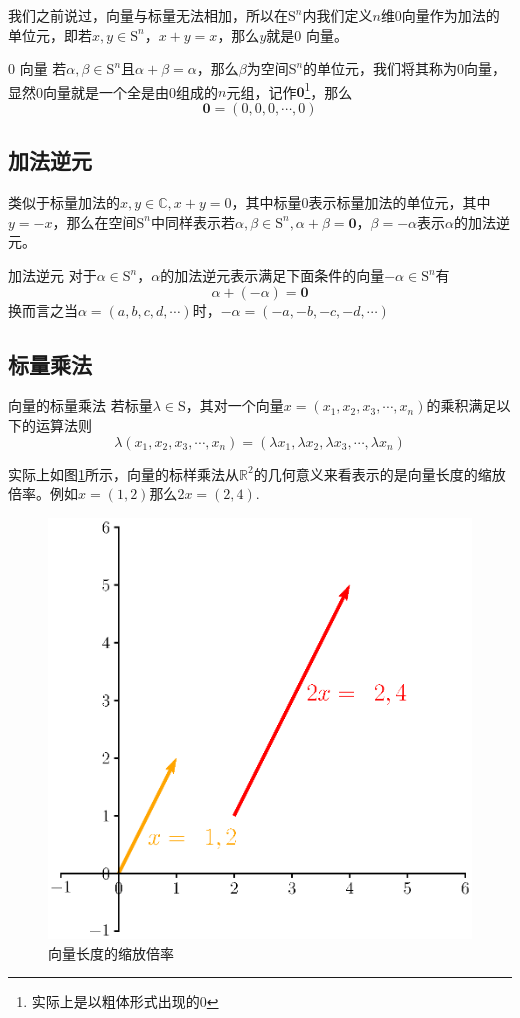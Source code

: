 我们之前说过，向量与标量无法相加，所以在$\mathrm{S}^n$内我们定义$n$维0向量作为加法的单位元，即若$x,y\in \mathrm{S}^n$，$x+y=x$，那么$y$就是0 向量。

\begin{definition}{0 向量}
	若$\alpha,\beta \in \mathrm{S}^n$且$\alpha+\beta = \alpha$，那么$\beta$为空间$\mathrm{S}^n$的单位元，我们将其称为0向量，显然0向量就是一个全是由0组成的$n$元组，记作$\boldsymbol{0}$\footnote{实际上是以粗体形式出现的0}，那么$$\boldsymbol{0}=(0,0,0,\cdots,0)$$
\end{definition}

\subsection{加法逆元}

类似于标量加法的$x,y\in \mathbb{C},x+y=0$，其中标量0表示标量加法的单位元，其中$y=-x$，那么在空间$\mathrm{S}^n$中同样表示若$\alpha,\beta \in \mathrm{S}^n,\alpha+\beta=\boldsymbol{0}$，$\beta=-\alpha$表示$\alpha$的加法逆元。

\begin{definition}{加法逆元}
	对于$\alpha \in \mathrm{S}^n$，$\alpha$的加法逆元表示满足下面条件的向量$-\alpha\in \mathrm{S}^n$有$$\alpha+(-\alpha)=\boldsymbol{0}$$换而言之当$\alpha=(a,b,c,d,\cdots)$时，$-\alpha=(-a,-b,-c,-d,\cdots)$
\end{definition}

\subsection{标量乘法}

\begin{definition}{向量的标量乘法}
	若标量$\lambda \in \mathrm{S}$，其对一个向量$x=(x_1,x_2,x_3,\cdots,x_n)$的乘积满足以下的运算法则$$\lambda(x_1,x_2,x_3,\cdots,x_n)=(\lambda x_1,\lambda x_2,\lambda x_3,\cdots,\lambda x_n)$$
\end{definition}

实际上如图\ref{fig:mulfsn}所示，向量的标样乘法从$\mathbb{R}^2$的几何意义来看表示的是向量长度的缩放倍率。例如$x=(1,2)$那么$2x=(2,4)$.

\begin{figure}[htbp]
	\centering
	\includegraphics[width=0.7\linewidth]{figure/eps/MulFSn}
	\caption{向量长度的缩放倍率}
	\label{fig:mulfsn}
\end{figure}

